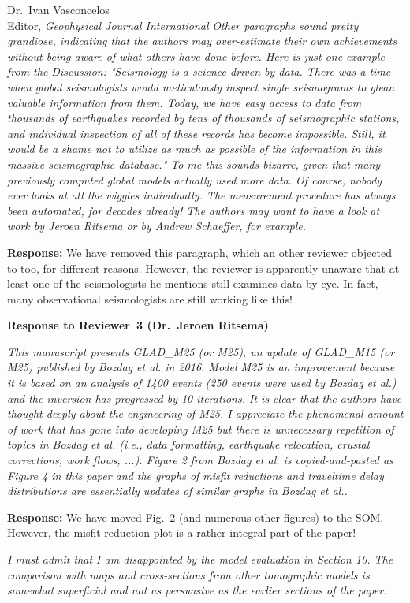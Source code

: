 \documentclass[11pt,a4paper]{letter}
\newcommand{\response}[1]{\textbf{Response:} #1}
\newcommand{\rev}[1]{{\it{#1}}}
\begin{document}
\begin{letter}{Dr.~Ivan Vasconcelos\\
Editor, \textit{Geophysical Journal International}}
\rev{Other paragraphs sound pretty grandiose, indicating that the authors may over-estimate their own achievements without being aware of what others have done before. Here is just one example from the Discussion: "Seismology is a science driven by data. There was a time when global seismologists would meticulously inspect single seismograms to glean valuable information from them. Today, we have easy access to data from thousands of earthquakes recorded by tens of thousands of seismographic stations, and individual inspection of all of these records has become impossible. Still, it would be a shame not to utilize as much as possible of the information in this massive seismographic database." To me this sounds bizarre, given that many previously computed global models actually used more data. Of course, nobody ever looks at all the wiggles individually. The measurement procedure has always been automated, for decades already! The authors may want to have a look at work by Jeroen Ritsema or by Andrew Schaeffer, for example.
}

\response{We have removed this paragraph, which an other reviewer objected to too, for different reasons.
However, the reviewer is apparently unaware that at least one of the seismologists he mentions still examines data by eye.
In fact,
many observational seismologists are still working like this!
}

{\textbf{\large{Response to Reviewer~3 (Dr.~Jeroen Ritsema)}}}

\rev{This manuscript presents GLAD\_M25 (or M25), un update of GLAD\_M15 (or M25) published by Bozdag et al. in 2016. Model M25 is an improvement because it is based on an analysis of 1400 events (250 events were used by Bozdag et al.) and the inversion has progressed by 10 iterations.
It is clear that the authors have thought deeply about the engineering of M25. I appreciate the phenomenal amount of work that has gone into developing M25 but there is unnecessary repetition of topics in Bozdag et al. (i.e., data formatting, earthquake relocation, crustal corrections, work flows, ...).
Figure 2 from Bozdag et al. is copied-and-pasted as Figure 4 in this paper and the graphs of misfit reductions and traveltime delay distributions are essentially updates of similar graphs in Bozdag et al..
}

\response{We have moved Fig.~2 (and numerous other figures) to the SOM. However, the misfit reduction plot is a rather integral part of the paper!}

\rev{I must admit that I am disappointed by the model evaluation in Section 10. The comparison with maps and cross-sections from other tomographic models is somewhat superficial and not as persuasive as the earlier sections of the paper.
}


\end{letter}
\end{document}
